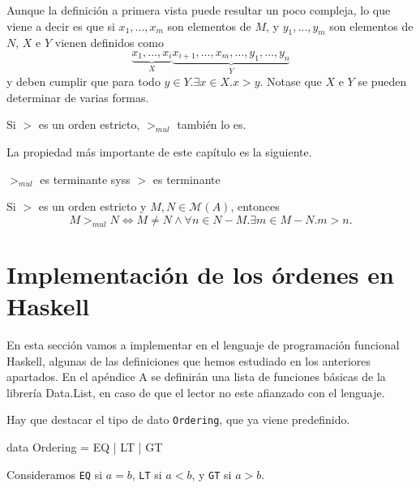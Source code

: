 Aunque la definición a primera vista puede resultar un poco compleja, lo que
viene a decir es que si $x_1, \dots, x_m$ son elementos de $M$, y
$y_1, \dots, y_m$ son elementos de $N$, $X$ e $Y$ vienen definidos como
\[ \underbrace{x_1, \dots, x_i}_{X} 
   \underbrace{x_{i+1}, \dots, x_m, \dots, y_1, \dots, y_n}_{Y} \] 
y deben cumplir que para todo $y \in Y. \exists x \in X. x>y$. Notase que $X$
e $Y$ se pueden determinar de varias formas.

\begin{lema}
  Si $>$ es un orden estricto, $>_{mul}$ también lo es.
\end{lema}

La propiedad más importante de este capítulo es la siguiente.

\begin{teor}
  $>_{mul}$ es terminante syss $>$ es terminante
\end{teor}

\begin{lema}\label{lemordsyss}
  Si $>$ es un orden estricto y $M,N \in \mathcal{M}(A)$, entonces
  \[ M >_{mul} N\Leftrightarrow M \neq N \wedge 
    \forall n \in N - M. \exists m \in M - N. m > n. \]
\end{lema}


\section{Implementación de los órdenes en Haskell}

En esta sección vamos a implementar en el lenguaje de programación
funcional Haskell, algunas de las definiciones que hemos estudiado en
los anteriores apartados. En el apéndice A se definirán una lista de
funciones básicas de la librería Data.List, en caso de que el lector
no este afianzado con el lenguaje.

Hay que destacar el tipo de dato \texttt{Ordering}, que ya viene predefinido.

\begin{preludio}
data Ordering = EQ | LT | GT
\end{preludio}

Consideramos \texttt{EQ} si $a = b$, \texttt{LT} si $a < b $, y
\texttt{GT} si $a > b$.

